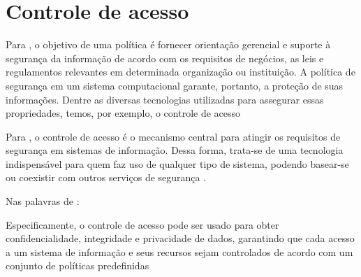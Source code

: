 



\section{Controle de acesso}\label{sec:controle_acesso}
Para , o objetivo de uma política é fornecer orientação gerencial e suporte à segurança da informação de acordo com os requisitos de negócios, as leis e regulamentos relevantes em determinada organização ou instituição. A política de segurança em um sistema computacional garante, portanto, a proteção de suas informações. Dentre as diversas tecnologias utilizadas para assegurar essas propriedades, temos, por exemplo, o controle de acesso \cite{sarkis:artigo:2016}

Para  , o controle de acesso é o mecanismo central para atingir os requisitos de segurança em  sistemas  de  informação. Dessa forma,  trata-se  de  uma  tecnologia indispensável para quem faz uso de qualquer tipo de sistema, podendo basear-se ou coexistir com outros serviços de segurança \cite{sandhu:1996}.

Nas palavras de :
\begin{citacao}
Especificamente, o controle de acesso pode ser usado para obter confidencialidade, integridade e privacidade de dados, garantindo que cada acesso a um sistema de informação e seus recursos sejam controlados de acordo com um conjunto de políticas predefinidas	
\end{citacao}


